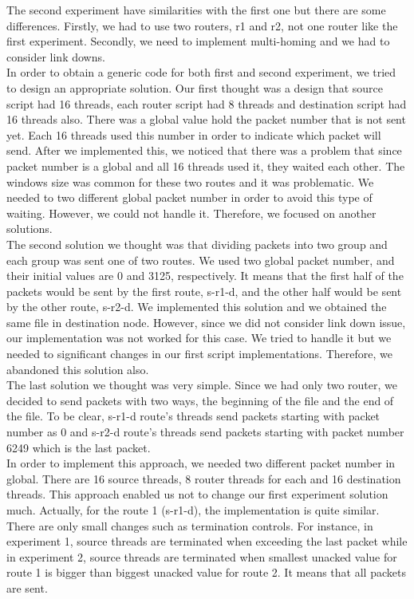 \documentclass[conference]{IEEEtran}
\begin{document}
The second experiment have similarities with the first one but there are some differences. Firstly, we had to use two routers, r1 and r2, not one router like the first experiment. Secondly, we need to implement multi-homing and we had to consider link downs. \\

In order to obtain a generic code for both first and second experiment, we tried to design an appropriate solution. Our first thought was a design that source script had 16 threads, each router script had 8 threads and destination script had 16 threads also. There was a global value hold the packet number that is not sent yet. Each 16 threads used this number in order to indicate which packet will send. After we implemented this, we noticed that there was a problem that since packet number is a global and all 16 threads used it, they waited each other. The windows size was common for these two routes and it was problematic. We needed to two different global packet number in order to avoid this type of waiting. However, we could not handle it. Therefore, we focused on another solutions. \\

The second solution we thought was that dividing packets into two group and each group was sent one of two routes. We used two global packet number, and their initial values are 0 and 3125, respectively. It means that the first half of the packets would be sent by the first route, s-r1-d, and the other half would be sent by the other route, s-r2-d. We implemented this solution and we obtained the same file in destination node. However, since we did not consider link down issue, our implementation was not worked for this case. We tried to handle it but we needed to significant changes in our first script implementations. Therefore, we abandoned this solution also. \\

The last solution we thought was very simple. Since we had only two router, we decided to send packets with two ways, the beginning of the file and the end of the file. To be clear, s-r1-d route's threads send packets starting with packet number as 0 and s-r2-d route's threads send packets starting with packet number 6249 which is the last packet. \\

In order to implement this approach, we needed two different packet number in global. There are 16 source threads, 8 router threads for each and 16 destination threads. This approach enabled us not to change our first experiment solution much. Actually, for the route 1 (s-r1-d), the implementation is quite similar. There are only small changes such as termination controls. For instance, in experiment 1, source threads are terminated when exceeding the last packet while in experiment 2, source threads are terminated when smallest unacked value for route 1 is bigger than biggest unacked value for route 2. It means that all packets are sent. \\
\end{document}
